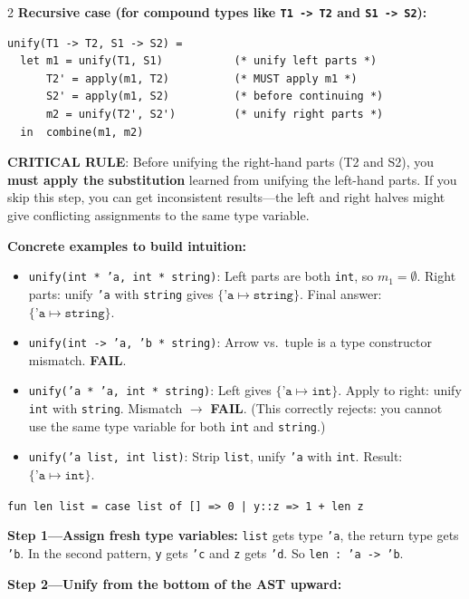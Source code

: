 \documentclass[9pt,landscape]{extarticle}
\begin{document}
\begin{multicols}{2}
\textbf{Recursive case (for compound types like \texttt{T1 -> T2} and \texttt{S1 -> S2}):}
\begin{lstlisting}
unify(T1 -> T2, S1 -> S2) =
  let m1 = unify(T1, S1)           (* unify left parts *)
      T2' = apply(m1, T2)          (* MUST apply m1 *)
      S2' = apply(m1, S2)          (* before continuing *)
      m2 = unify(T2', S2')         (* unify right parts *)
  in  combine(m1, m2)
\end{lstlisting}

\textbf{CRITICAL RULE}: Before unifying the right-hand parts (T2 and S2), you \textbf{must apply the substitution} learned from unifying the left-hand parts. If you skip this step, you can get inconsistent results---the left and right halves might give conflicting assignments to the same type variable.

\textbf{Concrete examples to build intuition:}
\begin{itemize}
  \item \texttt{unify(int * 'a, int * string)}: Left parts are both \texttt{int}, so $m_1 = \emptyset$. Right parts: unify \texttt{'a} with \texttt{string} gives $\{\texttt{'a} \mapsto \texttt{string}\}$. Final answer: $\{\texttt{'a} \mapsto \texttt{string}\}$.
  \item \texttt{unify(int -> 'a, 'b * string)}: Arrow vs.\ tuple is a type constructor mismatch. \textbf{FAIL}.
  \item \texttt{unify('a * 'a, int * string)}: Left gives $\{\texttt{'a} \mapsto \texttt{int}\}$. Apply to right: unify \texttt{int} with \texttt{string}. Mismatch $\to$ \textbf{FAIL}. (This correctly rejects: you cannot use the same type variable for both \texttt{int} and \texttt{string}.)
  \item \texttt{unify('a list, int list)}: Strip \texttt{list}, unify \texttt{'a} with \texttt{int}. Result: $\{\texttt{'a} \mapsto \texttt{int}\}$.
\end{itemize}

\begin{exambox}
\texttt{fun len list = case list of [] => 0 | y::z => 1 + len z}

\textbf{Step 1---Assign fresh type variables:} \texttt{list} gets type \texttt{'a}, the return type gets \texttt{'b}. In the second pattern, \texttt{y} gets \texttt{'c} and \texttt{z} gets \texttt{'d}. So \texttt{len : 'a -> 'b}.

\textbf{Step 2---Unify from the bottom of the AST upward:}


\end{exambox}
\end{multicols}
\end{document}

